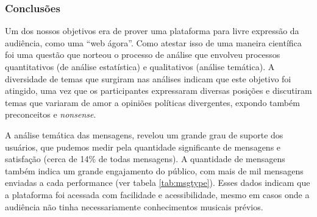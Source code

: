 


\subsubsection{Conclusões}


Um dos nossos objetivos era de prover uma plataforma para livre expressão da audiência, como uma ``web ágora''. Como atestar isso de uma maneira científica foi uma questão que norteou o processo de análise que envolveu processos quantitativos (de análise estatística) e qualitativos (análise temática). A diversidade de temas que surgiram nas análises indicam que este objetivo foi atingido, uma vez que os participantes expressaram diversas posições e discutiram temas que variaram de amor a opiniões políticas divergentes, expondo também preconceitos e \emph{nonsense}.

A análise temática das mensagens, revelou um grande grau de suporte dos usuários, que pudemos medir pela quantidade significante de mensagens e satisfação (cerca de 14\% de todas mensagens). A quantidade de mensagens também indica um grande engajamento do público, com mais de mil mensagens enviadas a cada performance (ver tabela \ref{tab:msgtype}). Esses dados indicam que a plataforma foi acessada com facilidade e acessibilidade, mesmo em casos onde a audiência não tinha necessariamente conhecimentos musicais prévios. 


